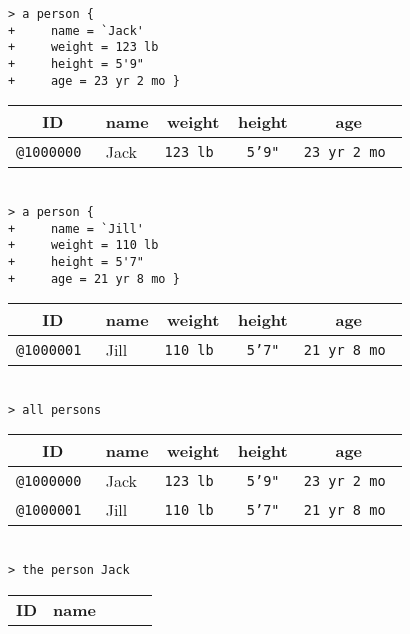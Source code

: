 \documentclass[12pt]{article}
\newenvironment{indpar}[1][0.3in]%
	{\begin{list}{}%
		     {\setlength{\itemsep}{0in}%
		      \setlength{\topsep}{0in}%
		      \setlength{\parsep}{1ex}%
		      \setlength{\labelwidth}{#1}%
		      \setlength{\leftmargin}{#1}%
		      \addtolength{\leftmargin}{\labelsep}}%
	 \item}%
	{\end{list}}
\begin{document}
\begin{indpar}
\verb|> a person {| \\
\verb|+     name = `Jack'| \\
\verb|+     weight = 123 lb| \\
\verb|+     height = 5'9"| \\
\verb|+     age = 23 yr 2 mo }| \\
\begin{tabular}{|r|l|r|r|r|}
\hline
\multicolumn{1}{|c}{\bf ID} &
\multicolumn{1}{|c}{\bf name} &
\multicolumn{1}{|c}{\bf weight} &
\multicolumn{1}{|c}{\bf height} &
\multicolumn{1}{|c|}{\bf age} \\
\hline
\tt @1000000 & Jack & \tt 123 lb & \tt 5'9" & \tt 23 yr 2 mo \\
\hline
\end{tabular} \\
\verb|> a person {| \\
\verb|+     name = `Jill'| \\
\verb|+     weight = 110 lb| \\
\verb|+     height = 5'7"| \\
\verb|+     age = 21 yr 8 mo }| \\
\begin{tabular}{|r|l|r|r|r|}
\hline
\multicolumn{1}{|c}{\bf ID} &
\multicolumn{1}{|c}{\bf name} &
\multicolumn{1}{|c}{\bf weight} &
\multicolumn{1}{|c}{\bf height} &
\multicolumn{1}{|c|}{\bf age} \\
\hline
\tt @1000001 & Jill & \tt 110 lb & \tt 5'7" & \tt 21 yr 8 mo \\
\hline
\end{tabular} \\
\verb|> all persons| \\
\begin{tabular}{|r|l|r|r|r|}
\hline
\multicolumn{1}{|c}{\bf ID} &
\multicolumn{1}{|c}{\bf name} &
\multicolumn{1}{|c}{\bf weight} &
\multicolumn{1}{|c}{\bf height} &
\multicolumn{1}{|c|}{\bf age} \\
\hline
\tt @1000000 & Jack & \tt 123 lb & \tt 5'9" & \tt 23 yr 2 mo \\
\tt @1000001 & Jill & \tt 110 lb & \tt 5'7" & \tt 21 yr 8 mo \\
\hline
\end{tabular} \\
\verb|> the person Jack| \\
\begin{tabular}{|r|l|r|r|r|}
\hline
\multicolumn{1}{|c}{\bf ID} &
\multicolumn{1}{|c}{\bf name} &

\end{tabular}
\end{indpar}
\end{document}
